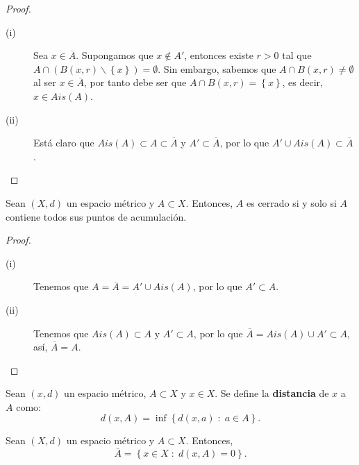\begin{proof}
\begin{description}
	\item[(i)] Sea $\displaystyle x \in \overline{A} $. Supongamos que $\displaystyle x \not\in A' $, entonces existe $\displaystyle r > 0 $ tal que $\displaystyle A \cap \left(B\left(x,r\right)\backslash \left\{ x\right\} \right) = \emptyset $. Sin embargo, sabemos que $\displaystyle A \cap B\left(x,r\right) \neq \emptyset $ al ser $\displaystyle x \in \overline{A} $, por tanto debe ser que $\displaystyle A \cap B\left(x,r\right) = \left\{ x\right\}  $, es decir, $\displaystyle x \in Ais\left(A\right) $.
\item[(ii)] Está claro que $\displaystyle Ais\left(A\right) \subset A \subset \overline{A} $ y $\displaystyle A' \subset \overline{A} $, por lo que $\displaystyle A' \cup Ais\left(A\right) \subset \overline{A} $.
\end{description}
\end{proof}
\begin{colorary}
Sean $\displaystyle \left(X,d\right) $ un espacio métrico y $\displaystyle A \subset X $. Entonces, $\displaystyle A $ es cerrado si y solo si $\displaystyle A $ contiene todos sus puntos de acumulación.
\end{colorary}
\begin{proof}
\begin{description}
\item[(i)] Tenemos que $\displaystyle A = \overline{A} = A' \cup Ais\left(A\right)  $, por lo que $\displaystyle A' \subset A $.
\item[(ii)] Tenemos que $\displaystyle Ais\left(A\right) \subset A $ y $\displaystyle A' \subset A $, por lo que $\displaystyle \overline{A} = Ais\left(A\right) \cup A' \subset A $, así, $\displaystyle \overline{A} = A $.
\end{description}
\end{proof}
\begin{definition}
	Sean $\displaystyle \left(x,d\right) $ un espacio métrico, $\displaystyle A \subset X $ y $\displaystyle x \in X $. Se define la \textbf{distancia} de $\displaystyle x $ a $\displaystyle A $ como:
\[d\left(x,A\right) = \inf \left\{ d\left(x,a\right) \; : \; a \in A\right\}  .\]
\end{definition}
\begin{prop}
	Sean $\displaystyle \left(X,d\right) $ un espacio métrico y $\displaystyle A \subset X $. Entonces, 
	\[ \overline{A} = \left\{ x \in X \; : \; d\left(x,A\right) = 0\right\}.\]
\end{prop}
